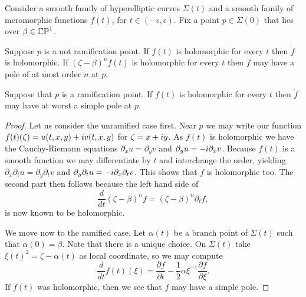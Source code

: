 \documentclass{article}
\begin{document}
\begin{lem}\label{lem:pole order}
Consider a smooth family of hyperelliptic curves $\Sigma(t)$ and 
a smooth family of meromorphic functions $f(t)$, for $t\in(-\epsilon,\epsilon)$.
Fix a point $p\in\Sigma(0)$ that lies over $\beta \in \mathbb{C}\text{P}^1$.

Suppose $p$ is a not ramification point. If $f(t)$ is holomorphic for every $t$ then $\dot{f}$ is holomorphic. If ${(\zeta - \beta)}^n f(t)$ is holomorphic for every $t$ then $\dot{f}$ may have a pole of at most order $n$ at $p$. 

Suppose that $p$ is a ramification point. If $f(t)$ is holomorphic for every $t$ then $\dot{f}$ may have at worst a simple pole at $p$.

\begin{proof}
Let us consider the unramified case first. Near $p$ we may write our function $f(t)(\zeta) = u(t,x,y) + i v(t,x,y)$ for $\zeta = x + i y$. As $f(t)$ is holomorphic we have the Cauchy-Riemann equations $\partial_x u = \partial_y v$ and $\partial_y u = -i \partial_x v$. Because $f(t)$ is a smooth function we may differentiate by $t$ and interchange the order, yielding $\partial_x\partial_t u = \partial_y\partial_t v$ and $\partial_y\partial_t u = -i \partial_x\partial_t v$. This shows that $\dot{f}$ is holomorphic too. The second part then follows because the left hand side of
\[
\frac{d}{d t}{(\zeta - \beta)}^n f = {(\zeta - \beta)}^n \partial_t f,
\]
is now known to be holomorphic.

We move now to the ramified case. Let $\alpha(t)$ be a branch point of $\Sigma(t)$ such that $\alpha(0)=\beta$. Note that there is a unique choice. On $\Sigma(t)$ take $\xi(t)^2 = \zeta - \alpha(t)$ as local coordinate, so we may compute
\[
\frac{d}{dt}f(t)(\xi)
= \frac{\partial f}{\partial t} - \frac{1}{2}\dot{\alpha}\xi^{-1}\frac{\partial f}{\partial\xi}.
\]
If $f(t)$ was holomorphic, then we see that $\dot{f}$ may have a simple pole. 
\end{proof}
\end{lem}
\end{document}
